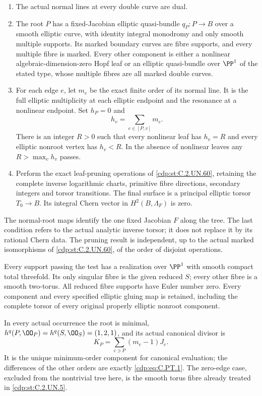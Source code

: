 \begin{proposition}
\begin{enumerate}
\item The actual normal lines at every double curve are dual.
\item The root $P$ has a fixed-Jacobian elliptic quasi-bundle
$q_P:P\to B$ over a smooth elliptic curve, with identity integral
monodromy and only smooth multiple supports. Its marked boundary
curves are fibre supports, and every multiple fibre is marked.
Every other component is either a nonlinear algebraic-dimension-zero
Hopf leaf or an elliptic quasi-bundle over $\PP^1$ of the stated
type, whose multiple fibres are all marked double curves.
\item For each edge $e$, let $m_e$ be the exact finite order of
its normal line. It is the full elliptic multiplicity at each
elliptic endpoint and the resonance at a nonlinear endpoint.
Set $h_P=0$ and
\[
                  h_v=\sum_{e\in[P,v]}m_e.
                  \tag{C.PT.1}\label{cdp:eq:C.PT.1}
\]
There is an integer $R>0$ such that every nonlinear leaf has
$h_v=R$ and every elliptic nonroot vertex has $h_v<R$.
In the absence of nonlinear leaves any $R>\max_vh_v$ passes.
\item Perform the exact leaf-pruning operations of \ref{cdp:st:C.2.UN.60},
retaining the complete inverse logarithmic charts, primitive fibre
directions, secondary integers and torsor transitions. The final
surface is a principal elliptic torsor $T_0\to B$. Its integral
Chern vector in $H^2(B,\Lambda_F)$ is zero.
\end{enumerate}

The normal-root maps identify the one fixed Jacobian $F$ along
the tree. The last condition refers to the actual analytic
inverse torsor; it does not replace it by its rational Chern
data. The pruning result is independent, up to the actual
marked isomorphisms of \ref{cdp:st:C.2.UN.60}, of the order of disjoint operations.

Every support passing the test has a realization over $\PP^1$
with smooth compact total threefold. Its only singular fibre
is the given reduced $S$; every other fibre is a smooth
two-torus. All reduced fibre supports have Euler number zero.
Every component and every specified elliptic gluing map is
retained, including the complete torsor of every original
properly elliptic nonroot component.

In every actual occurrence the root is minimal,
$h^q(P,\OO_P)=h^q(S,\OO_S)=(1,2,1)$, and its actual canonical
divisor is
\[
                 K_P=\sum_{e\ni P}(m_e-1)J_e.
                 \tag{C.PT.2}\label{cdp:eq:C.PT.2}
\]
It is the unique minimum-order component for canonical evaluation;
the differences of the other orders are exactly \eqref{cdp:eq:C.PT.1}.
The zero-edge case, excluded from the nontrivial tree here,
is the smooth torus fibre already treated in \ref{cdp:st:C.2.UN.5}.
\end{proposition}


